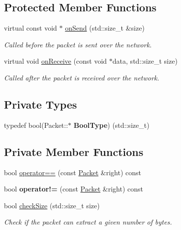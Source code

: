 \subsection*{Protected Member Functions}
\begin{DoxyCompactItemize}
\item 
virtual const void $\ast$ \mbox{\hyperlink{classsf_1_1_packet_a052e955906c9bfd671622cb625380edc}{on\+Send}} (std\+::size\+\_\+t \&size)
\begin{DoxyCompactList}\small\item\em Called before the packet is sent over the network. \end{DoxyCompactList}\item 
virtual void \mbox{\hyperlink{classsf_1_1_packet_ab71a31ef0f1d5d856de6f9fc75434128}{on\+Receive}} (const void $\ast$data, std\+::size\+\_\+t size)
\begin{DoxyCompactList}\small\item\em Called after the packet is received over the network. \end{DoxyCompactList}\end{DoxyCompactItemize}
\subsection*{Private Types}
\begin{DoxyCompactItemize}
\item 
\mbox{\label{classsf_1_1_packet_af4e23b49b9465634c0b23aaabd94b820}} 
typedef bool(Packet\+::$\ast$ {\bfseries Bool\+Type}) (std\+::size\+\_\+t)
\end{DoxyCompactItemize}
\subsection*{Private Member Functions}
\begin{DoxyCompactItemize}
\item 
bool \mbox{\hyperlink{classsf_1_1_packet_aa3136a586a93cde1f54e669b7430dcc9}{operator==}} (const \mbox{\hyperlink{classsf_1_1_packet}{Packet}} \&right) const
\item 
\mbox{\label{classsf_1_1_packet_aba88e3aab53d6991bf7c001f8a416871}} 
bool {\bfseries operator!=} (const \mbox{\hyperlink{classsf_1_1_packet}{Packet}} \&right) const
\item 
bool \mbox{\hyperlink{classsf_1_1_packet_a54bea2433002686cf1de8c5c6466fe5f}{check\+Size}} (std\+::size\+\_\+t size)
\begin{DoxyCompactList}\small\item\em Check if the packet can extract a given number of bytes. \end{DoxyCompactList}\end{DoxyCompactItemize}
